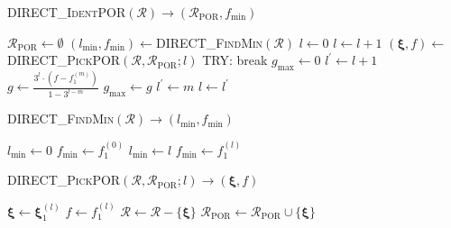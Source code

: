 ﻿\documentclass{jsarticle}
\begin{document}
\begin{algorithm}[tbh]
\caption{\textsc{DIRECT\_IdentPOR}$(\mathcal{R})\rightarrow(\mathcal{R}_{\mathrm{POR}},f_{\mathrm{min}})$}
\label{alg:direct_ident_por}
\begin{algorithmic}[1]
\State $\mathcal{R}_{\mathrm{POR}}\leftarrow\emptyset$
\State $(l_{\mathrm{min}},f_{\mathrm{min}})\leftarrow$\textsc{DIRECT\_FindMin}$(\mathcal{R})$
  \State {}
\EndIf
\State $l\leftarrow 0$
  \State $l\leftarrow l+1$
\EndWhile
{}
  \State $(\bm{\xi},f)\leftarrow$\textsc{DIRECT\_PickPOR}$(\mathcal{R},\mathcal{R}_{\mathrm{POR}};l)$
  \State TRY:
    \State break
  \EndIf
  \State $g_{\mathrm{max}}\leftarrow 0$
  \State $l^{\prime}\leftarrow l+1$
      \State $g\leftarrow\frac{3^{l}\cdot(f-f^{(m)}_{1})}{1-3^{l-m}}$
        \State $g_{\mathrm{max}}\leftarrow g$
        \State $l^{\prime}\leftarrow m$
      \EndIf
    \EndIf
  \EndFor
  \State $l\leftarrow l^{\prime}$
\EndWhile
\State {}
\end{algorithmic}
\end{algorithm}

\begin{algorithm}[tbh]
\caption{\textsc{DIRECT\_FindMin}$(\mathcal{R})\rightarrow(l_{\mathrm{min}},f_{\mathrm{min}})$}
\label{alg:direct_find_min}
\begin{algorithmic}[1]
\State $l_{\mathrm{min}}\leftarrow 0$
\State $f_{\mathrm{min}}\leftarrow f^{(0)}_{1}$
    $l_{\mathrm{min}}\leftarrow l$
    $f_{\mathrm{min}}\leftarrow f^{(l)}_{1}$
  \EndIf
\EndFor
\State {}
\end{algorithmic}
\end{algorithm}

\begin{algorithm}[tbh]
\caption{\textsc{DIRECT\_PickPOR}$(\mathcal{R},\mathcal{R}_{\mathrm{POR}};l)\rightarrow(\bm{\xi},f)$}
\label{alg:direct_pick_por}
\begin{algorithmic}[1]
\State $\bm{\xi}\leftarrow\bm{\xi}^{(l)}_{1}$
\State $f\leftarrow f^{(l)}_{1}$
\State $\mathcal{R}\leftarrow\mathcal{R}-\{\bm{\xi}\}$
\State $\mathcal{R}_{\mathrm{POR}}\leftarrow\mathcal{R}_{\mathrm{POR}}\cup\{\bm{\xi}\}$
\State {}
\end{algorithmic}
\end{algorithm}
\end{document}
